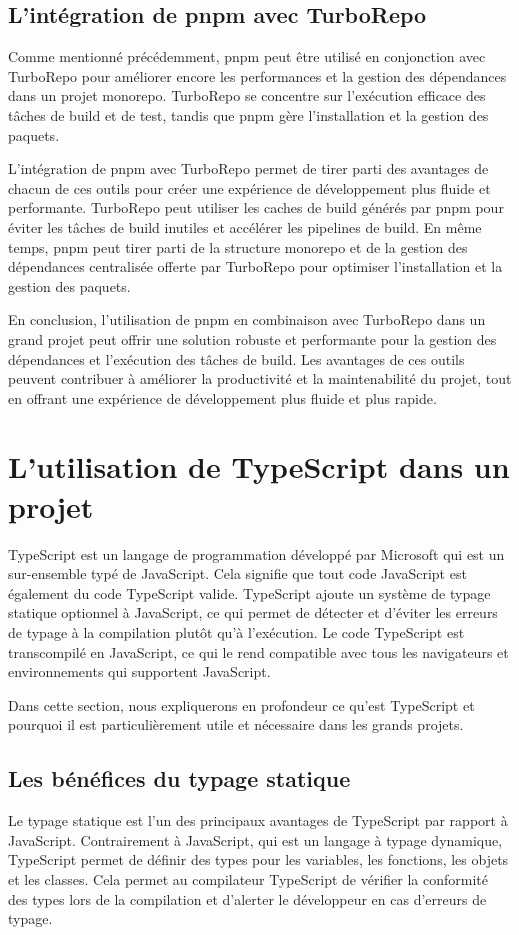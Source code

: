 \subsection{L'intégration de pnpm avec TurboRepo}

Comme mentionné précédemment, pnpm peut être utilisé en conjonction avec TurboRepo pour améliorer encore les performances et la gestion des dépendances dans un projet monorepo. TurboRepo se concentre sur l'exécution efficace des tâches de build et de test, tandis que pnpm gère l'installation et la gestion des paquets.

L'intégration de pnpm avec TurboRepo permet de tirer parti des avantages de chacun de ces outils pour créer une expérience de développement plus fluide et performante. TurboRepo peut utiliser les caches de build générés par pnpm pour éviter les tâches de build inutiles et accélérer les pipelines de build. En même temps, pnpm peut tirer parti de la structure monorepo et de la gestion des dépendances centralisée offerte par TurboRepo pour optimiser l'installation et la gestion des paquets.

En conclusion, l'utilisation de pnpm en combinaison avec TurboRepo dans un grand projet peut offrir une solution robuste et performante pour la gestion des dépendances et l'exécution des tâches de build. Les avantages de ces outils peuvent contribuer à améliorer la productivité et la maintenabilité du projet, tout en offrant une expérience de développement plus fluide et plus rapide.


\section{L'utilisation de TypeScript dans un projet}
TypeScript est un langage de programmation développé par Microsoft qui est un sur-ensemble typé de JavaScript. Cela signifie que tout code JavaScript est également du code TypeScript valide. TypeScript ajoute un système de typage statique optionnel à JavaScript, ce qui permet de détecter et d'éviter les erreurs de typage à la compilation plutôt qu'à l'exécution. Le code TypeScript est transcompilé en JavaScript, ce qui le rend compatible avec tous les navigateurs et environnements qui supportent JavaScript.

Dans cette section, nous expliquerons en profondeur ce qu'est TypeScript et pourquoi il est particulièrement utile et nécessaire dans les grands projets.

\subsection{Les bénéfices du typage statique}
Le typage statique est l'un des principaux avantages de TypeScript par rapport à JavaScript. Contrairement à JavaScript, qui est un langage à typage dynamique, TypeScript permet de définir des types pour les variables, les fonctions, les objets et les classes. Cela permet au compilateur TypeScript de vérifier la conformité des types lors de la compilation et d'alerter le développeur en cas d'erreurs de typage.

